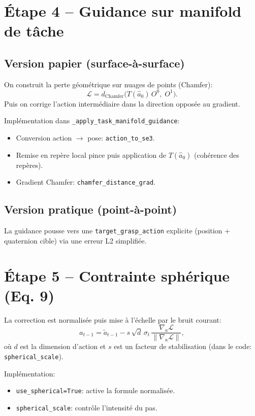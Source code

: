 \documentclass[11pt,a4paper]{article}
\begin{document}
\section{Étape 4 -- Guidance sur manifold de tâche}
\subsection{Version papier (surface-à-surface)}
On construit la perte géométrique sur nuages de points (Chamfer):
\begin{equation}
\mathcal L = d_{\text{Chamfer}}\big(T(\hat a_0)\,O^0,\;O^1\big).
\end{equation}
Puis on corrige l'action intermédiaire dans la direction opposée au gradient.

Implémentation dans \texttt{\_apply\_task\_manifold\_guidance}:
\begin{itemize}
\item Conversion action $\to$ pose: \texttt{action\_to\_se3}.
\item Remise en repère local pince puis application de $T(\hat a_0)$ (cohérence des repères).
\item Gradient Chamfer: \texttt{chamfer\_distance\_grad}.
\end{itemize}

\subsection{Version pratique (point-à-point)}
La guidance pousse vers une \texttt{target\_grasp\_action} explicite (position + quaternion cible) via une erreur L2 simplifiée.

\section{Étape 5 -- Contrainte sphérique (Eq. 9)}
La correction est normalisée puis mise à l'échelle par le bruit courant:
\begin{equation}
 a_{t-1} = \tilde a_{t-1} - s\,\sqrt{d}\,\sigma_t\,\frac{\nabla_a\mathcal L}{\|\nabla_a\mathcal L\|},
\end{equation}
où $d$ est la dimension d'action et $s$ est un facteur de stabilisation (dans le code: \texttt{spherical\_scale}).

Implémentation:
\begin{itemize}
\item \texttt{use\_spherical=True}: active la formule normalisée.
\item \texttt{spherical\_scale}: contrôle l'intensité du pas.
\end{itemize}
\end{document}
